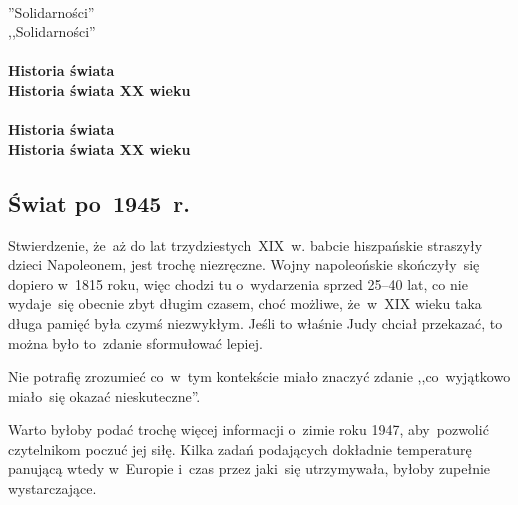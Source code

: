 \documentclass[a4paper,11pt]{article}
\begin{document}
\noi
{} \\
\Jest  ''Solidarności'' \\
\Powin ,,Solidarności'' \\
 \\
\Jest  \textbf{Historia świata} \\
\Powin \textbf{Historia świata XX wieku} \\
 \\
\Jest  \textbf{Historia świata} \\
\Powin \textbf{Historia świata XX wieku} \\

\vspace{\spaceTwo}





\subsection{Świat po~1945~r.}

\vspace{\spaceThree}





\start {} Stwierdzenie, że~aż do lat trzydziestych~XIX~w. babcie
hiszpańskie straszyły dzieci Napoleonem, jest trochę niezręczne. Wojny
napoleońskie skończyły~się dopiero w~1815 roku, więc chodzi tu
o~wydarzenia sprzed 25--40 lat, co nie wydaje~się obecnie zbyt długim
czasem, choć możliwe, że~w~XIX wieku taka długa pamięć była czymś
niezwykłym. Jeśli to właśnie Judy chciał przekazać, to można było
to~zdanie sformułować lepiej.

\vspace{\spaceFour}


\start {} Nie potrafię zrozumieć co~w~tym kontekście miało
znaczyć zdanie ,,co~wyjątkowo miało~się okazać nieskuteczne''.

\vspace{\spaceFour}


\start {} Warto byłoby podać trochę więcej informacji o~zimie
roku 1947, aby~pozwolić czytelnikom poczuć jej siłę. Kilka zadań
podających dokładnie temperaturę panującą wtedy w~Europie i~czas przez
jaki~się utrzymywała, byłoby zupełnie wystarczające.
\end{document}
